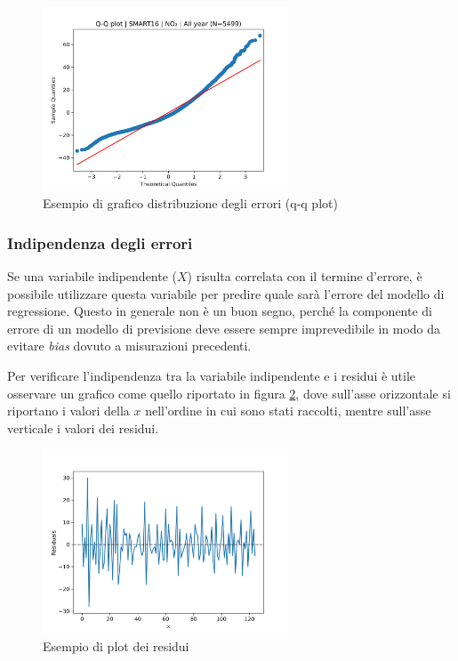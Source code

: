 \begin{figure}[H]
\centering
\includegraphics[width=0.65\textwidth,height=\textheight,keepaspectratio]{img/res_no2_qq}
\caption{Esempio di grafico distribuzione degli errori (q-q plot)}
\label{fig:distr_errori}
\end{figure}

\subsubsection{Indipendenza degli errori}\label{ssec:correlazione-errore-variabili}
Se una variabile indipendente ($X$) risulta correlata con il termine d’errore, è possibile utilizzare questa variabile per predire quale sarà l’errore del modello di regressione. Questo in generale non è un buon segno, perché la componente di errore di un modello di previsione deve essere sempre imprevedibile in modo da evitare \textit{bias} dovuto a misurazioni precedenti.

Per verificare l'indipendenza tra la variabile indipendente e i residui è utile osservare un grafico come quello riportato in figura \ref{fig:residui-plot}, dove sull’asse orizzontale si riportano i valori della $x$ nell'ordine in cui sono stati raccolti, mentre sull’asse verticale i valori dei residui.

\begin{figure}[H]
\centering
\includegraphics[width=0.65\textwidth,height=\textheight,keepaspectratio]{img/residual_plot}
\caption{Esempio di plot dei residui}
\label{fig:residui-plot}
\end{figure}

